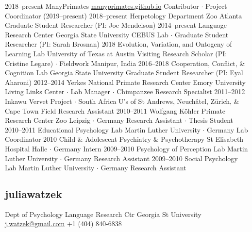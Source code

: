 \documentclass[]{friggeri-cv}
\begin{document}
\begin{entrylist}
  \entry
    {2018--present}
    {ManyPrimates}
    {\href{https://manyprimates.github.io}{manyprimates.github.io}}
    {Contributor $\cdot$ Project Coordinator (2019--present)}
  \entry
    {2018--present}
    {Herpetology Department}
    {Zoo Atlanta}
    {Graduate Student Researcher (PI: Joe Mendelson)}
  \entry
    {2014--present}
    {Language Research Center}
    {Georgia State University}
    {CEBUS Lab $\cdot$ Graduate Student Researcher (PI: Sarah Brosnan)}
  \entry
    {2018}
    {Evolution, Variation, and Ontogeny of Learning Lab}
    {University of Texas at Austin}
    {Visiting Research Scholar (PI: Cristine Legare) $\cdot$ Fieldwork Manipur, India}
  \entry
    {2016--2018}
    {Cooperation, Conflict, \& Cognition Lab}
    {Georgia State University}
    {Graduate Student Researcher (PI: Eyal Aharoni)}
  \entry
    {2012--2014}
    {Yerkes National Primate Research Center}
    {Emory University}
    {Living Links Center $\cdot$ Lab Manager $\cdot$ Chimpanzee Research Specialist}
  \entry
    {2011--2012}
    {Inkawu Vervet Project $\cdot$ South Africa}
    {U's of St Andrews, Neuch\^{a}tel, Z\"urich, \& Cape Town}
    {Field Research Assistant}
  \entry
    {2010--2011}
    {Wolfgang K\"{o}hler Primate Research Center}
    {Zoo Leipzig $\cdot$ Germany}
    {Research Assistant $\cdot$ Thesis Student}
  \entry
    {2010--2011}
    {Educational Psychology Lab}
    {Martin Luther University $\cdot$ Germany}
    {Lab Coordinator}
  \entry
    {2010}
    {Child \& Adolescent Psychiatry \& Psychotherapy}
    {St Elisabeth Hospital Halle $\cdot$ Germany}
    {Intern}
  \entry
    {2009--2010}
    {Psychology of Perception Lab}
    {Martin Luther University $\cdot$ Germany}
    {Research Assistant}
  \entry
    {2009--2010}
    {Social Psychology Lab}
    {Martin Luther University $\cdot$ Germany}
    {Research Assistant}
\end{entrylist}




\begin{aside}
  \section{{\normalfont julia}watzek}
    Dept of Psychology
    Language Research Ctr
    Georgia St University
    ~
    \href{mailto:j.watzek@gmail.com}{j.watzek@gmail.com}
    +1 (404) 840-6838
\end{aside}
\end{document}
